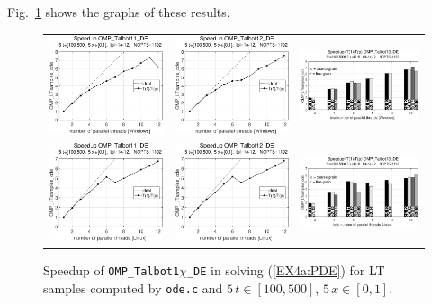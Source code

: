\documentclass[a4paper,10pt]{report}%
\begin{document}
Fig.~\ref{PAR_EX4a_speedup_ode} shows the graphs of these results.
\begin{figure}[htb]
\centering
\begin{tabular}{ccc}%
\includegraphics[height=0.2\textwidth]{./FIGS/EX4a/EX4a_ode_speedup_11_5t_100_Windows.eps} &
\includegraphics[height=0.2\textwidth]{./FIGS/EX4a/EX4a_ode_speedup_12_5t_100_Windows.eps} &
\includegraphics[height=0.2\textwidth,keepaspectratio=true]{./FIGS/EX4a/EX4a_ode_speedup_13_5t_100_Windows.eps} \\
\includegraphics[height=0.2\textwidth]{./FIGS/EX4a/EX4a_ode_speedup_11_5t_100_Linux.eps} &
\includegraphics[height=0.2\textwidth]{./FIGS/EX4a/EX4a_ode_speedup_12_5t_100_Linux.eps} &
\includegraphics[height=0.2\textwidth,keepaspectratio=true]{./FIGS/EX4a/EX4a_ode_speedup_13_5t_100_Linux.eps}
\end{tabular}
\caption{\small Speedup of {\tt OMP\_Talbot1$\chi$\_DE} in solving (\ref{EX4a:PDE}) for LT samples
computed by {\tt ode.c} and $5\,t\in[100,500]$, $5\,x\in[0,1]$.}
\label{PAR_EX4a_speedup_ode}
\end{figure}
\end{document}
